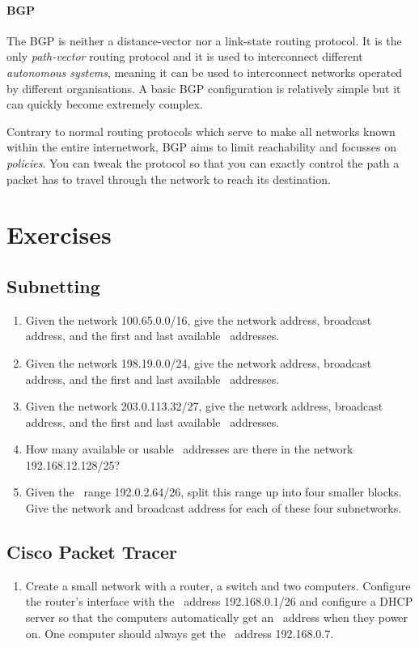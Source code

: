 \paragraph{\acf{BGP}}
The \acl{BGP} is neither a distance-vector nor a link-state routing protocol.
It is the only \emph{path-vector} routing protocol and it is used to interconnect different \emph{autonomous systems}, meaning it can be used to interconnect networks operated by different organisations.
A basic \acs{BGP} configuration is relatively simple but it can quickly become extremely complex.

Contrary to normal routing protocols which serve to make all networks known within the entire internetwork, \acs{BGP} aims to limit reachability and focusses on \emph{policies}.
You can tweak the protocol so that you can exactly control the path a packet has to travel through the network to reach its destination.



\section{Exercises}
\label{sec:ip-exercises}
\subsection{Subnetting}
\begin{enumerate}
\item
   Given the network 100.65.0.0/16, give the network address, broadcast address, and the first and last available \IP\ addresses.
\item
   Given the network 198.19.0.0/24, give the network address, broadcast address, and the first and last available \IP\ addresses.
\item
   Given the network 203.0.113.32/27, give the network address, broadcast address, and the first and last available \IP\ addresses.
\item
   How many available or usable \IP\ addresses are there in the network 192.168.12.128/25?
\item
   Given the \IP\ range 192.0.2.64/26, split this range up into four smaller blocks.
   Give the network and broadcast address for each of these four subnetworks.
\end{enumerate}

\subsection{Cisco Packet Tracer}
\begin{enumerate}[resume]
\item
   Create a small network with a router, a switch and two computers.
   Configure the router's interface with the \IP\ address 192.168.0.1/26 and configure a \acs{DHCP} server so that the computers automatically get an \IP\ address when they power on.
   One computer should always get the \IP\ address 192.168.0.7.
\end{enumerate}



